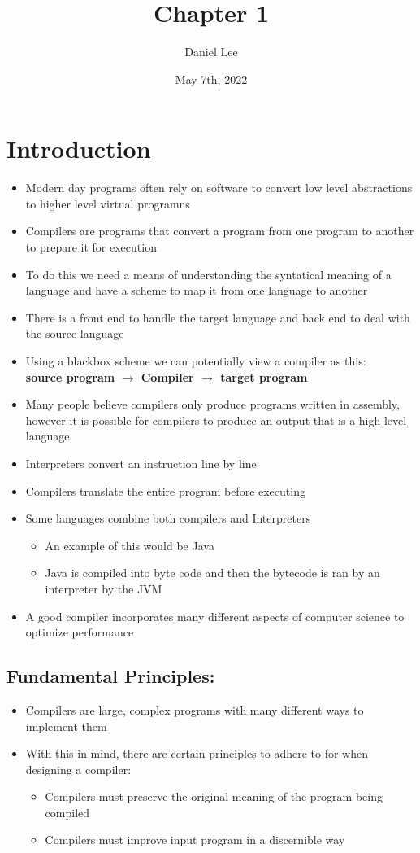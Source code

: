 \documentclass[20pt]{article}
\title{Chapter 1}
\author{Daniel Lee}
\date{May 7th,  2022}
\begin{document}
\maketitle
\newpage
\justify
\section*{Introduction}
	\begin{itemize}
	\item Modern day programs often rely on software to convert low level abstractions to higher level virtual programns
  	\item Compilers are programs that convert a program from one program to another to prepare it for execution
    \item To do this we need a means of understanding the syntatical meaning of a language and have a scheme to map it from one language to another
  	\item There is a front end to handle the target language and back end to deal with the source language
    \item Using a blackbox scheme we can potentially view a compiler as this:\\
	\textbf{source program $\rightarrow$ Compiler $\rightarrow$ target program}
	\item Many people believe compilers only produce programs written in assembly, however it is possible for compilers to produce an output that is a high level language
 	\item Interpreters convert an instruction line by line
    \item Compilers translate the entire program before executing
    \item Some languages combine both compilers and Interpreters
    \begin{itemize}
		\item An example of this would be Java
  		\item Java is compiled into byte code and then the bytecode is ran by an interpreter by the JVM 
	\end{itemize}
	\item A good compiler incorporates many different aspects of computer science to optimize performance
	\end{itemize}
\subsection*{Fundamental Principles:}
	\begin{itemize}
		\item Compilers are large, complex programs with many different ways to implement them
 		\item With this in mind, there are certain principles to adhere to for when designing a compiler:
		\begin{itemize}
			\item Compilers must preserve the original meaning of the program being compiled 
   			\item Compilers must improve input program in a discernible way
		\end{itemize}
	\end{itemize}
\newpage
\end{document}
